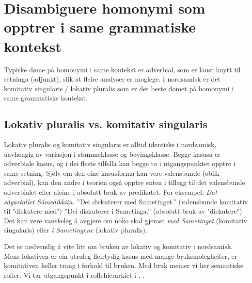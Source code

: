 \documentclass[a4paper,norsk]{article}
\begin{document}
\section{Disambiguere homonymi som opptrer i same grammatiske kontekst}



Typiske døme på homonymi i same kontekst er adverbial, som er laust knytt til setninga (adjunkt), slik at fleire analyser er moglege. I nordsamisk er det komitativ singularis / lokativ pluralis som er det beste dømet på homonymi i same grammatiske kontekst. %





\subsection{Lokativ pluralis vs. komitativ singularis}


Lokativ pluralis og komitativ singularis er alltid identiske i nordsamisk, uavhengig av variasjon i stammeklasse og bøyingsklasse. Begge kasusa er adverbiale kasus, og i dei fleste tilfella kan begge to i utgangspunktet opptre i same setning. Sjølv om den eine kasusforma kan vere valensbunde (oblik adverbial), kan den andre i teorien også opptre enten i tillegg til det valensbunde adverbialet eller aleine i absolutt bruk av predikatet.
For eksempel:
\textit {Dat ságastallet Sámedikkiin.}
''Dei diskuterer med Sametinget.'' (valensbunde komitativ til "diskutere med")
''Dei diskuterer i Sametinga.'' (absolutt bruk av "diskutere")
Det kan vere vanskeleg å avgjere om noko skal gjerast \textit{med Sametinget} (komitativ singularis) eller \textit{i Sametingene} (lokativ pluralis). %

Det er nødvendig å vite litt om bruken av lokativ og komitativ i nordsamisk. Mens lokativen er ein utruleg fleirtydig kasus med mange bruksmolegheiter, er komitativen heller trang i forhold til bruken. Med bruk meiner vi her semantiske roller. Vi tar utgangspunkt i rollehierarkiet i \citet{Sammallahti02},\citet{Sammallahti05} %
.
\end{document}
